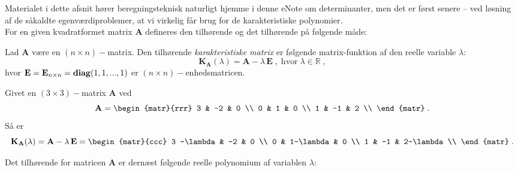 Materialet i dette afsnit hører beregningsteknisk naturligt hjemme i denne eNote om determinanter, men det er først senere -- ved
løsning af de såkaldte egenværdiproblemer, at vi virkelig får brug for de karakteristiske polynomier.\\

For en given kvadratformet matrix $\mathbf{A}$ defineres den tilhørende 
og det tilhørende  på følgende måde:

\begin{definition}
Lad $\mathbf{A}$ være en $(n \times n)-$matrix. Den tilhørende {\textit{karakteristiske matrix}} er følgende matrix-funktion af den reelle variable $\lambda$:
\begin{equation}
\mathbf{K}_{\mathbf{A}}(\lambda) = \mathbf{A} - \lambda\,\mathbf{E} \;, \;\textrm{hvor} \;\lambda \in \mathbb{R} \;,
\end{equation}
hvor $\mathbf{E} = \mathbf{E}_{n \times n} = \operatorname{\bf{diag}}(1, 1, . . . , 1)$ er $(n \times n)-$enhedsmatricen.

\end{definition}

\begin{example}  \label{exampKarakMat}
Givet en $(3 \times 3)-$matrix $\mathbf{A}$ ved
\begin{equation}
\mathbf{A} = \begin{matr}{rrr}
             3 & -2 & 0 \\
             0 & 1 & 0 \\
             1 & -1 & 2 \\
           \end{matr} \;.
\end{equation}
Så er
\begin{equation}
\mathbf{K}_{\mathbf{A}}(\lambda) = \mathbf{A} - \lambda\,\mathbf{E} = \begin{matr}{ccc}
            3 -\lambda & -2 & 0 \\
             0 & 1-\lambda  & 0 \\
             1 & -1 & 2-\lambda  \\
           \end{matr} \;.
\end{equation}
\end{example}


Det tilhørende  for matricen $\mathbf{A}$ er dernæst følgende reelle polynomium af variablen $\lambda$:

